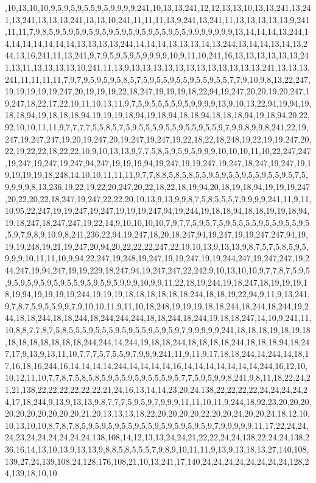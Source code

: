 ,10,13,10,10,9,5,9,5,9,5,5,9,5,9,9,9,9,241,10,13,13,241,12,12,13,13,10,13,13,241,13,241,13,241,13,13,13,241,13,13,10,241,11,11,11,13,9,241,13,241,11,13,13,13,13,13,9,241,11,11,7,9,8,5,9,5,9,5,9,5,9,5,9,5,9,5,9,5,9,5,5,9,5,5,9,9,9,9,9,9,9,13,14,14,14,13,244,14,14,14,14,14,14,14,13,13,13,13,244,14,14,14,13,13,13,14,13,244,13,14,14,13,14,13,244,13,16,241,11,13,241,9,7,9,5,9,5,9,5,9,9,9,9,10,9,11,10,241,16,13,13,13,13,13,13,241,13,11,13,13,13,13,10,241,11,13,9,13,13,13,13,13,13,13,13,13,13,13,13,241,13,13,13,241,11,11,11,11,7,9,7,9,5,9,5,9,5,8,5,7,5,9,5,5,9,5,5,9,5,5,9,5,5,7,7,9,10,9,8,13,22,247,19,19,19,19,19,247,20,19,19,19,22,18,247,19,19,19,18,22,94,19,247,20,20,19,20,247,19,247,18,22,17,22,10,11,10,13,11,9,7,5,9,5,5,5,5,9,5,9,9,9,9,13,9,10,13,22,94,19,94,19,18,18,94,19,18,18,18,94,19,19,19,18,94,19,18,94,18,18,94,18,18,18,94,19,18,94,20,22,92,10,10,11,11,9,7,7,7,7,5,5,8,5,7,5,9,5,5,5,9,5,5,9,5,5,9,5,5,9,7,9,9,8,9,9,8,241,22,19,247,19,247,247,19,20,19,247,20,19,247,19,247,19,22,18,22,18,248,19,22,19,19,247,20,22,19,22,22,18,22,22,10,9,10,13,13,9,7,7,5,8,5,9,5,9,5,9,9,9,10,10,10,11,10,22,247,247,19,247,19,247,19,247,94,247,19,19,19,94,19,247,19,19,247,19,247,18,247,19,247,19,19,19,19,19,18,248,14,10,10,11,11,11,9,7,7,8,8,5,8,5,8,5,5,9,5,9,5,5,9,5,5,9,5,5,9,5,7,5,9,9,9,9,8,13,236,19,22,19,22,20,247,20,22,18,22,18,19,94,20,18,19,18,94,19,19,19,247,20,22,20,22,18,247,19,247,22,22,20,10,13,9,13,9,9,8,7,5,8,5,5,5,7,9,9,9,9,241,11,9,11,10,95,22,247,19,19,247,19,247,19,19,19,247,94,19,244,19,18,18,94,18,18,19,19,18,94,19,18,247,18,247,247,19,22,14,9,10,10,10,10,7,9,7,7,5,9,5,7,5,9,5,5,5,5,9,5,5,9,5,5,9,5,5,9,7,9,8,9,10,9,8,241,236,22,94,19,247,18,20,18,247,94,19,247,19,19,247,247,94,19,19,19,248,19,21,19,247,20,94,20,22,22,22,247,22,19,10,13,9,13,13,9,8,7,5,7,5,8,5,9,5,9,9,9,10,11,11,10,9,94,22,247,19,248,19,247,19,19,247,19,19,244,247,19,247,247,19,244,247,19,94,247,19,19,229,18,247,94,19,247,247,22,242,9,10,13,10,10,9,7,7,8,7,5,9,5,9,5,9,5,9,5,9,5,9,5,5,9,5,9,5,9,5,9,9,9,10,9,9,11,22,18,19,244,19,18,247,18,19,19,19,18,19,94,19,19,19,19,244,19,19,19,18,18,18,18,18,18,244,18,18,19,22,94,9,11,9,13,241,9,7,8,7,5,9,5,5,9,9,7,9,10,10,11,9,11,10,18,248,19,19,19,18,18,244,18,244,18,244,19,244,18,18,244,18,18,244,18,244,244,244,18,18,244,18,244,19,18,18,247,14,10,9,241,11,10,8,8,7,7,8,7,5,8,5,5,5,9,5,5,5,9,5,9,5,5,9,5,9,5,9,7,9,9,9,9,9,241,18,18,18,19,18,19,18,18,18,18,18,18,18,18,244,244,14,244,19,18,18,244,18,18,18,18,244,18,18,18,94,18,247,17,9,13,9,13,11,10,7,7,7,5,7,5,5,9,7,9,9,9,241,11,9,11,9,17,18,18,244,14,244,14,18,17,16,18,16,244,16,14,14,14,14,244,14,14,14,14,16,14,14,14,14,14,14,14,244,16,12,10,10,12,11,10,7,7,8,7,5,8,5,8,5,9,5,5,9,5,9,5,5,5,9,5,7,7,5,9,5,9,9,8,241,9,8,11,18,22,24,21,21,138,22,22,22,22,22,22,21,24,16,13,14,14,23,20,24,138,22,22,22,22,24,24,24,24,24,17,18,244,9,13,9,13,13,9,8,7,7,7,5,9,5,9,7,9,9,9,11,11,10,11,9,244,18,92,23,20,20,20,20,20,20,20,20,20,20,21,20,13,13,13,18,22,20,20,20,20,22,20,20,24,20,20,24,18,12,10,10,13,10,10,8,7,8,7,8,5,9,5,9,5,9,5,5,9,5,5,9,5,9,5,9,5,9,5,9,7,9,9,9,9,9,11,17,22,24,24,24,23,24,24,24,24,24,24,138,108,14,12,13,13,24,24,21,22,22,24,24,138,22,24,24,138,236,16,14,13,10,13,9,13,13,9,8,8,5,8,5,5,5,7,9,8,9,10,11,11,9,13,9,13,18,13,27,140,108,139,27,24,139,108,24,128,176,108,21,10,13,241,17,140,24,24,24,24,24,24,24,24,128,24,139,18,10,10